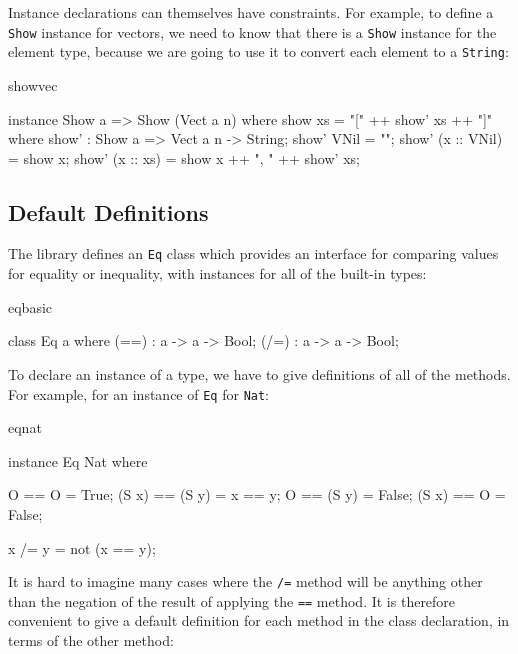 Instance declarations can themselves have constraints. For example, to define a
\texttt{Show} instance for vectors, we need to know that there is a \texttt{Show} 
instance for the element type, because we are going to use it to convert each element
to a \texttt{String}:

\begin{SaveVerbatim}{showvec}

instance Show a => Show (Vect a n) where {
    show xs = "[" ++ show' xs ++ "]" where {
        show' : Show a => Vect a n -> String;
        show' VNil = "";
        show' (x :: VNil) = show x;
        show' (x :: xs) = show x ++ ", " ++ show' xs;
    }
}

\end{SaveVerbatim}

\subsection{Default Definitions}

The library defines an \texttt{Eq} class which provides an interface for comparing
values for equality or inequality, with instances for all of the built-in types:

\begin{SaveVerbatim}{eqbasic}

class Eq a where {
    (==) : a -> a -> Bool;
    (/=) : a -> a -> Bool;
}

\end{SaveVerbatim}

\noindent
To declare an instance of a type, we have to give definitions of all of the methods.
For example, for an instance of \texttt{Eq} for \texttt{Nat}:

\begin{SaveVerbatim}{eqnat}

instance Eq Nat where {
    O     == O     = True;
    (S x) == (S y) = x == y;
    O     == (S y) = False;
    (S x) == O     = False;

    x /= y = not (x == y);
}

\end{SaveVerbatim}

\noindent
It is hard to imagine many cases where the \texttt{/=} method will be anything other
than the negation of the result of applying the \texttt{==} method. It is therefore
convenient to give a default definition for each method in the class
declaration, in terms of the other method:

